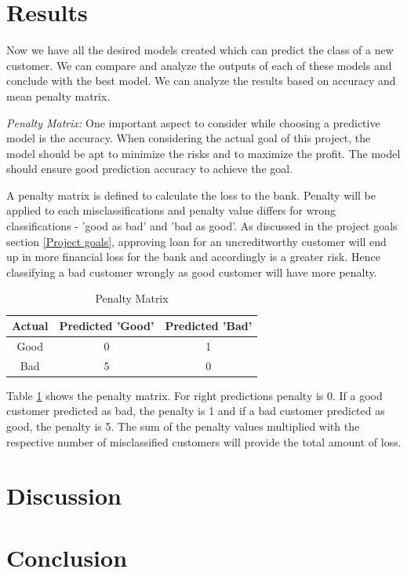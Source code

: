 \documentclass[sigconf]{acmart}
\begin{document}
\section{Results}

Now we have all the desired models created which can predict the class of a new customer. We can compare and analyze the outputs of each of these models and conclude with the best model. We can analyze the results based on accuracy and mean penalty matrix.

\textit{Penalty Matrix:} One important aspect to consider while choosing a predictive model is the accuracy. When considering the actual goal of this project, the model should be apt to minimize the risks and to maximize the profit. The model should ensure good prediction accuracy to achieve the goal. 

A penalty matrix is defined to calculate the loss to the bank. Penalty will be applied to each misclassifications and penalty value differs for wrong classifications - 'good as bad' and 'bad as good'. As discussed in the project goals section \ref{Project goals}, approving loan for an uncreditworthy customer will end up in more financial loss for the bank and accordingly is a greater risk. Hence classifying a bad customer wrongly as good customer will have more penalty.  

\begin{table}
  \caption{Penalty Matrix
  \cite{psu-site}}
  \label{tab:table4}
  \begin{tabular}{ccc}
    \toprule
     Actual& Predicted 'Good'& Predicted 'Bad'\\
    \midrule
    Good& 0& 1\\
    Bad& 5& 0\\
    \bottomrule
  \end{tabular}
\end{table}

Table \ref{tab:table4} shows the penalty matrix. For right predictions penalty is 0. If a good customer predicted as bad, the penalty is 1 and if a bad customer predicted as good, the penalty is 5. The sum of the penalty values multiplied with the respective number of misclassified customers will provide the total amount of loss.

\section{Discussion}




\section{Conclusion}
\end{document}
